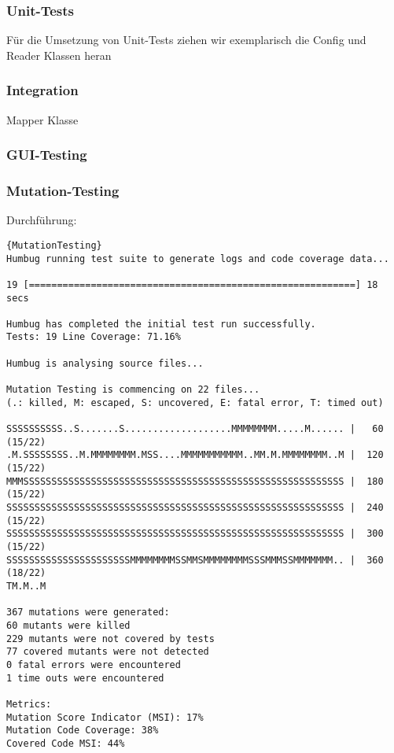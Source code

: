 \subsubsection{Unit-Tests}
Für die Umsetzung von Unit-Tests ziehen wir exemplarisch die Config und Reader Klassen heran


\subsubsection{Integration}

Mapper Klasse

\subsubsection{GUI-Testing}

\subsubsection{Mutation-Testing}

Durchführung:
\begin{lstlisting}[caption=Ausführung des Mutation-Testing]{MutationTesting}
Humbug running test suite to generate logs and code coverage data...

19 [==========================================================] 18 secs

Humbug has completed the initial test run successfully.
Tests: 19 Line Coverage: 71.16%

Humbug is analysing source files...

Mutation Testing is commencing on 22 files...
(.: killed, M: escaped, S: uncovered, E: fatal error, T: timed out)

SSSSSSSSSS..S.......S...................MMMMMMMM.....M...... |   60 (15/22)
.M.SSSSSSSS..M.MMMMMMMM.MSS....MMMMMMMMMMM..MM.M.MMMMMMMM..M |  120 (15/22)
MMMSSSSSSSSSSSSSSSSSSSSSSSSSSSSSSSSSSSSSSSSSSSSSSSSSSSSSSSSS |  180 (15/22)
SSSSSSSSSSSSSSSSSSSSSSSSSSSSSSSSSSSSSSSSSSSSSSSSSSSSSSSSSSSS |  240 (15/22)
SSSSSSSSSSSSSSSSSSSSSSSSSSSSSSSSSSSSSSSSSSSSSSSSSSSSSSSSSSSS |  300 (15/22)
SSSSSSSSSSSSSSSSSSSSSSMMMMMMMMSSMMSMMMMMMMMSSSMMMSSMMMMMMM.. |  360 (18/22)
TM.M..M

367 mutations were generated:
60 mutants were killed
229 mutants were not covered by tests
77 covered mutants were not detected
0 fatal errors were encountered
1 time outs were encountered

Metrics:
Mutation Score Indicator (MSI): 17%
Mutation Code Coverage: 38%
Covered Code MSI: 44%
\end{lstlisting}



